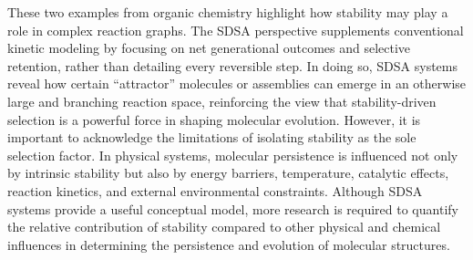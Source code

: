 \documentclass[preprint,12pt]{elsarticle}
\begin{document}
These two examples from organic chemistry highlight how stability may play a role in complex reaction graphs. The SDSA perspective supplements conventional kinetic modeling by focusing on net generational outcomes and selective retention, rather than detailing every reversible step. In doing so, SDSA systems reveal how certain ``attractor'' molecules or assemblies can emerge in an otherwise large and branching reaction space, reinforcing the view that stability-driven selection is a powerful force in shaping molecular evolution. However, it is important to acknowledge the limitations of isolating stability as the sole selection factor. In physical systems, molecular persistence is influenced not only by intrinsic stability but also by energy barriers, temperature, catalytic effects, reaction kinetics, and external environmental constraints. Although SDSA systems provide a useful conceptual model, more research is required to quantify the relative contribution of stability compared to other physical and chemical influences in determining the persistence and evolution of molecular structures.
\end{document}
